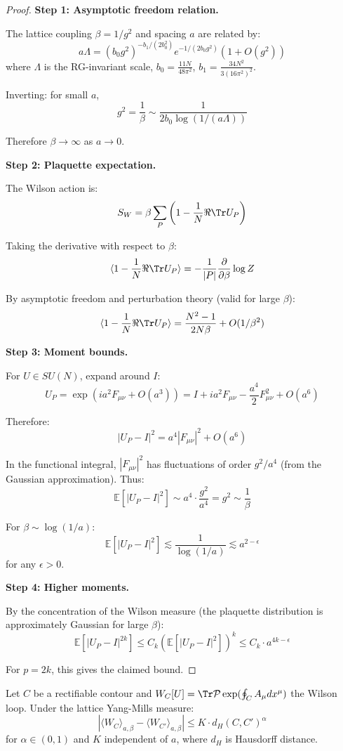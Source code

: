 \begin{proof}
\textbf{Step 1: Asymptotic freedom relation.}

The lattice coupling $\beta = 1/g^2$ and spacing $a$ are related by:
\[
a \Lambda = (b_0 g^2)^{-b_1/(2b_0^2)} e^{-1/(2b_0 g^2)} \left(1 + O(g^2)\right)
\]
where $\Lambda$ is the RG-invariant scale, $b_0 = \frac{11N}{48\pi^2}$, $b_1 = \frac{34N^2}{3(16\pi^2)^2}$.

Inverting: for small $a$,
\[
g^2 = \frac{1}{\beta} \sim \frac{1}{2b_0 \log(1/(a\Lambda))}
\]

Therefore $\beta \to \infty$ as $a \to 0$.

\textbf{Step 2: Plaquette expectation.}

The Wilson action is:
\[
S_W = \beta \sum_P \left(1 - \frac{1}{N}\Re\Tr U_P\right)
\]

Taking the derivative with respect to $\beta$:
\[
\langle 1 - \frac{1}{N}\Re\Tr U_P \rangle = -\frac{1}{|P|}\frac{\partial}{\partial\beta}\log Z
\]

By asymptotic freedom and perturbation theory (valid for large $\beta$):
\[
\langle 1 - \frac{1}{N}\Re\Tr U_P \rangle = \frac{N^2-1}{2N\beta} + O(1/\beta^2)
\]

\textbf{Step 3: Moment bounds.}

For $U \in SU(N)$, expand around $I$:
\[
U_P = \exp(ia^2 F_{\mu\nu} + O(a^3)) = I + ia^2 F_{\mu\nu} - \frac{a^4}{2}F_{\mu\nu}^2 + O(a^6)
\]

Therefore:
\[
|U_P - I|^2 = a^4 |F_{\mu\nu}|^2 + O(a^6)
\]

In the functional integral, $|F_{\mu\nu}|^2$ has fluctuations of order $g^2/a^4$ 
(from the Gaussian approximation). Thus:
\[
\mathbb{E}[|U_P - I|^2] \sim a^4 \cdot \frac{g^2}{a^4} = g^2 \sim \frac{1}{\beta}
\]

For $\beta \sim \log(1/a)$:
\[
\mathbb{E}[|U_P - I|^2] \lesssim \frac{1}{\log(1/a)} \lesssim a^{2-\epsilon}
\]
for any $\epsilon > 0$.

\textbf{Step 4: Higher moments.}

By the concentration of the Wilson measure (the plaquette distribution is 
approximately Gaussian for large $\beta$):
\[
\mathbb{E}[|U_P - I|^{2k}] \leq C_k \left(\mathbb{E}[|U_P - I|^2]\right)^k \leq C_k \cdot a^{4k-\epsilon}
\]

For $p = 2k$, this gives the claimed bound.
\end{proof}

\begin{theorem}
\label{thm:holder-wilson}
Let $C$ be a rectifiable contour and $W_C[U] = \Tr \mathcal{P}\exp(\oint_C A_\mu dx^\mu)$ 
the Wilson loop. Under the lattice Yang-Mills measure:
\[
\left| \langle W_C \rangle_{a,\beta} - \langle W_{C'} \rangle_{a,\beta} \right| 
\leq K \cdot d_H(C, C')^\alpha
\]
for $\alpha \in (0, 1)$ and $K$ independent of $a$, where $d_H$ is Hausdorff distance.
\end{theorem}

